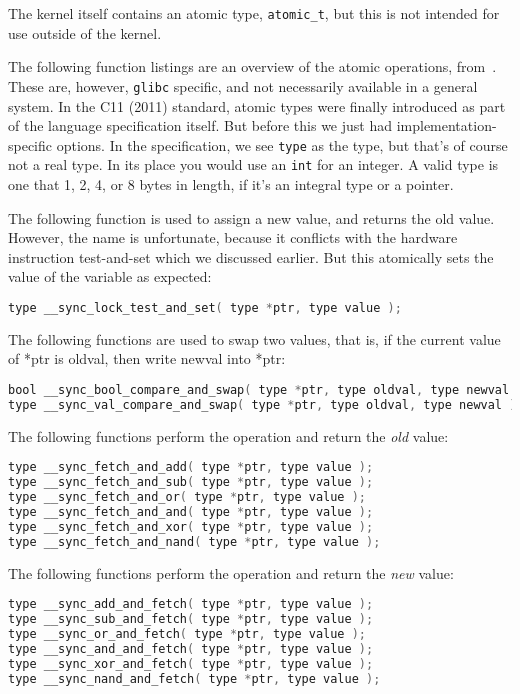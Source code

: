 The kernel itself contains an atomic type, \texttt{atomic\_t}, but this is not intended for use outside of the kernel.

The following function listings are an overview of the atomic operations, from~\cite{gccatomic}. These are, however, \texttt{glibc} specific, and not necessarily available in a general system. In the C11 (2011) standard, atomic types were finally introduced as part of the language specification itself. But before this we just had implementation-specific options. In the specification, we see \texttt{type} as the type, but that's of course not a real type. In its place you would use an \texttt{int} for an integer. A valid type is one that 1, 2, 4, or 8 bytes in length, if it's an integral type or a pointer.

The following function is used to assign a new value, and returns the old value. However, the name is unfortunate, because it conflicts with the hardware instruction test-and-set which we discussed earlier. But this atomically sets the value of the variable as expected:

\begin{lstlisting}[language=C]
type __sync_lock_test_and_set( type *ptr, type value );
\end{lstlisting}


The following functions are used to swap two values, that is, if the current value of *ptr is oldval, then write newval into *ptr:

\begin{lstlisting}[language=C]
bool __sync_bool_compare_and_swap( type *ptr, type oldval, type newval );
type __sync_val_compare_and_swap( type *ptr, type oldval, type newval );
\end{lstlisting}


The following functions perform the operation and return the \textit{old} value:
\begin{lstlisting}[language=C]
type __sync_fetch_and_add( type *ptr, type value );
type __sync_fetch_and_sub( type *ptr, type value );
type __sync_fetch_and_or( type *ptr, type value );
type __sync_fetch_and_and( type *ptr, type value );
type __sync_fetch_and_xor( type *ptr, type value );
type __sync_fetch_and_nand( type *ptr, type value );
\end{lstlisting}

The following functions perform the operation and return the \textit{new} value:
\begin{lstlisting}[language=C]
type __sync_add_and_fetch( type *ptr, type value );
type __sync_sub_and_fetch( type *ptr, type value );
type __sync_or_and_fetch( type *ptr, type value );
type __sync_and_and_fetch( type *ptr, type value );
type __sync_xor_and_fetch( type *ptr, type value );
type __sync_nand_and_fetch( type *ptr, type value );
\end{lstlisting}



